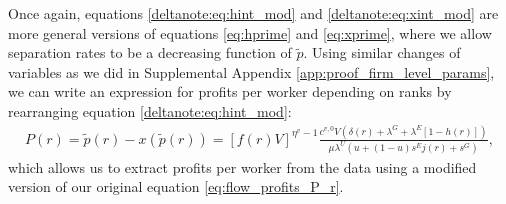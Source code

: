 %
Once again, equations \eqref{deltanote:eq:hint_mod} and \eqref{deltanote:eq:xint_mod} are more general versions of equations \eqref{eq:hprime} and \eqref{eq:xprime}, where we allow separation rates to be a decreasing function of $\tilde{p}$. Using similar changes of variables as we did in Supplemental Appendix \ref{app:proof_firm_level_params}, we can write an expression for profits per worker depending on ranks by rearranging equation \eqref{deltanote:eq:hint_mod}:
%
\begin{align}
    P(r) = \tilde{p}(r) - x(\tilde{p}(r)) = [f(r) V]^{\eta^{v}-1} \frac{ c^{v,0} V \left( \delta(r) + \lambda^{G} + \lambda^{E} [1 - h(r)] \right)}{\mu \lambda^{U} \left( u + (1-u) s^{E} j(r) + s^{G} \right)}, \label{deltanote:eq:profits_per_worker}
\end{align}
%
which allows us to extract profits per worker from the data using a modified version of our original equation \eqref{eq:flow_profits_P_r}.

